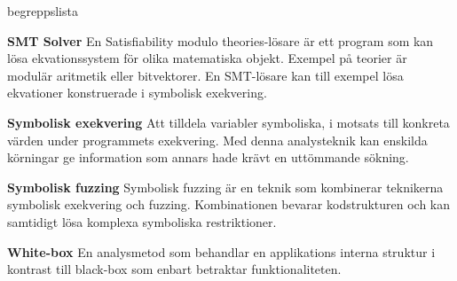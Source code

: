 \begin{labeling}{begreppslista}
	\item [\textbf{SMT Solver}] En Satisfiability modulo theories-lösare är ett
	program som kan lösa ekvationssystem för olika matematiska objekt. Exempel
	på teorier är modulär aritmetik eller bitvektorer. En SMT-lösare kan till
	exempel lösa ekvationer konstruerade i symbolisk exekvering.

	\item [\textbf{Symbolisk exekvering}] Att tilldela variabler symboliska, i
	motsats till konkreta värden under programmets exekvering. Med denna
	analysteknik kan enskilda körningar ge information som annars hade krävt
	en uttömmande sökning.

	\item [\textbf{Symbolisk fuzzing}] Symbolisk fuzzing är en teknik som
	kombinerar teknikerna symbolisk exekvering och fuzzing. Kombinationen
	bevarar kodstrukturen och kan samtidigt lösa komplexa symboliska
	restriktioner.

	\item [\textbf{White-box}] En analysmetod som behandlar en applikations
	interna struktur i kontrast till black-box som enbart betraktar
	funktionaliteten.
\end{labeling}
